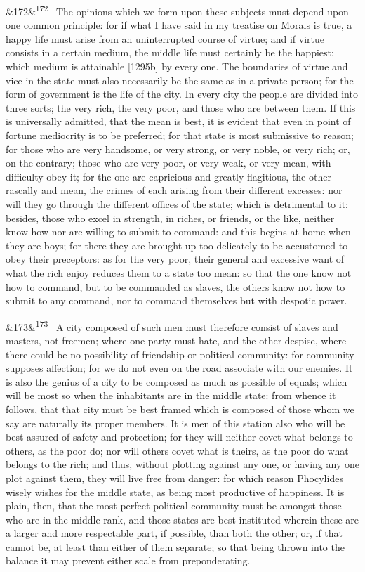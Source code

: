 \documentclass[12pt]{article}
\newcommand{\para}[1][]{\par\noindent\ifx&#1&\else\textsuperscript{\footnotesize #1}~\fi}
\begin{document}
\para[172] The opinions which we form upon these subjects must depend upon one common principle: for if what I have said in my treatise on Morals is true, a happy life must arise from an uninterrupted course of virtue; and if virtue consists in a certain medium, the middle life must certainly be the happiest; which medium is attainable [1295b] by every one. The boundaries of virtue and vice in the state must also necessarily be the same as in a private person; for the form of government is the life of the city. In every city the people are divided into three sorts; the very rich, the very poor, and those who are between them. If this is universally admitted, that the mean is best, it is evident that even in point of fortune mediocrity is to be preferred; for that state is most submissive to reason; for those who are very handsome, or very strong, or very noble, or very rich; or, on the contrary; those who are very poor, or very weak, or very mean, with difficulty obey it; for the one are capricious and greatly flagitious, the other rascally and mean, the crimes of each arising from their different excesses: nor will they go through the different offices of the state; which is detrimental to it: besides, those who excel in strength, in riches, or friends, or the like, neither know how nor are willing to submit to command: and this begins at home when they are boys; for there they are brought up too delicately to be accustomed to obey their preceptors: as for the very poor, their general and excessive want of what the rich enjoy reduces them to a state too mean: so that the one know not how to command, but to be commanded as slaves, the others know not how to submit to any command, nor to command themselves but with despotic power.

\para[173] A city composed of such men must therefore consist of slaves and masters, not freemen; where one party must hate, and the other despise, where there could be no possibility of friendship or political community: for community supposes affection; for we do not even on the road associate with our enemies. It is also the genius of a city to be composed as much as possible of equals; which will be most so when the inhabitants are in the middle state: from whence it follows, that that city must be best framed which is composed of those whom we say are naturally its proper members. It is men of this station also who will be best assured of safety and protection; for they will neither covet what belongs to others, as the poor do; nor will others covet what is theirs, as the poor do what belongs to the rich; and thus, without plotting against any one, or having any one plot against them, they will live free from danger: for which reason Phocylides wisely wishes for the middle state, as being most productive of happiness. It is plain, then, that the most perfect political community must be amongst those who are in the middle rank, and those states are best instituted wherein these are a larger and more respectable part, if possible, than both the other; or, if that cannot be, at least than either of them separate; so that being thrown into the balance it may prevent either scale from preponderating.
\end{document}
